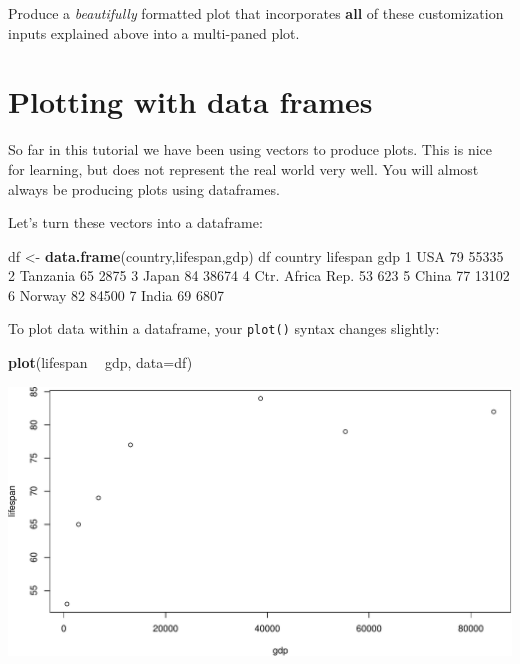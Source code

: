 \documentclass[
]{book}
\newenvironment{Shaded}{\begin{snugshade}}{\end{snugshade}}
\newcommand{\DataTypeTok}[1]{\textcolor[rgb]{0.13,0.29,0.53}{#1}}
\newcommand{\DecValTok}[1]{\textcolor[rgb]{0.00,0.00,0.81}{#1}}
\newcommand{\KeywordTok}[1]{\textcolor[rgb]{0.13,0.29,0.53}{\textbf{#1}}}
\newcommand{\NormalTok}[1]{#1}
\newcommand{\OperatorTok}[1]{\textcolor[rgb]{0.81,0.36,0.00}{\textbf{#1}}}
\newcommand{\StringTok}[1]{\textcolor[rgb]{0.31,0.60,0.02}{#1}}
\begin{document}
Produce a \emph{beautifully} formatted plot that incorporates \textbf{all} of these customization inputs explained above into a multi-paned plot.

\hypertarget{plotting-with-data-frames}{%
\section*{Plotting with data frames}\label{plotting-with-data-frames}}

So far in this tutorial we have been using vectors to produce plots. This is nice for learning, but does not represent the real world very well. You will almost always be producing plots using dataframes.

Let's turn these vectors into a dataframe:

\begin{Shaded}
\begin{Highlighting}[]
\NormalTok{df <-}\StringTok{ }\KeywordTok{data.frame}\NormalTok{(country,lifespan,gdp)}
\NormalTok{df}
\NormalTok{           country lifespan   gdp}
\DecValTok{1}\NormalTok{              USA       }\DecValTok{79} \DecValTok{55335}
\DecValTok{2}\NormalTok{         Tanzania       }\DecValTok{65}  \DecValTok{2875}
\DecValTok{3}\NormalTok{            Japan       }\DecValTok{84} \DecValTok{38674}
\DecValTok{4}\NormalTok{ Ctr. Africa Rep.       }\DecValTok{53}   \DecValTok{623}
\DecValTok{5}\NormalTok{            China       }\DecValTok{77} \DecValTok{13102}
\DecValTok{6}\NormalTok{           Norway       }\DecValTok{82} \DecValTok{84500}
\DecValTok{7}\NormalTok{            India       }\DecValTok{69}  \DecValTok{6807}
\end{Highlighting}
\end{Shaded}

To plot data within a dataframe, your \texttt{plot()} syntax changes slightly:

\begin{Shaded}
\begin{Highlighting}[]
\KeywordTok{plot}\NormalTok{(lifespan }\OperatorTok{~}\StringTok{ }\NormalTok{gdp, }\DataTypeTok{data=}\NormalTok{df)}
\end{Highlighting}
\end{Shaded}

\includegraphics{figures/unnamed-chunk-115-1.pdf}
\end{document}
